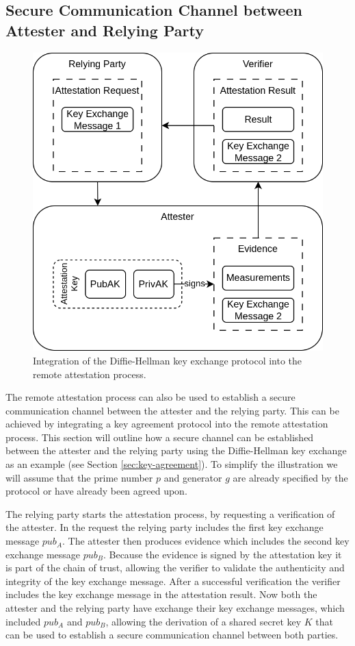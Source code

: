 \subsection{Secure Communication Channel between Attester and Relying Party}
\label{sec:ra-secure-communication-channel}

\begin{figure}[H]
  \centering
  \includegraphics[width=0.5\linewidth]{resources/ra-key-exchange.drawio.png}
  \caption{Integration of the Diffie-Hellman key exchange protocol into the remote attestation process.}
  \label{fig:ra-key-exchange}
\end{figure}

The remote attestation process can also be used to establish a secure
communication channel between the attester and the relying party. This can be
achieved by integrating a key agreement protocol into the remote attestation
process. This section will outline how a secure channel can be established
between the attester and the relying party using the Diffie-Hellman key exchange
as an example (see Section \ref{sec:key-agreement}). To simplify the
illustration we will assume that the prime number $p$ and generator $g$ are
already specified by the protocol or have already been agreed upon.

The relying party starts the attestation process, by requesting a verification
of the attester. In the request the relying party includes the first key
exchange message $pub_A$. The attester then produces evidence which includes the
second key exchange message $pub_B$. Because the evidence is signed by the
attestation key it is part of the chain of trust, allowing the verifier to
validate the authenticity and integrity of the key exchange message. After a
successful verification the verifier includes the key exchange message in the
attestation result. Now both the attester and the relying party have exchange
their key exchange messages, which included $pub_A$ and $pub_B$, allowing the
derivation of a shared secret key $K$ that can be used to establish a secure
communication channel between both parties.

